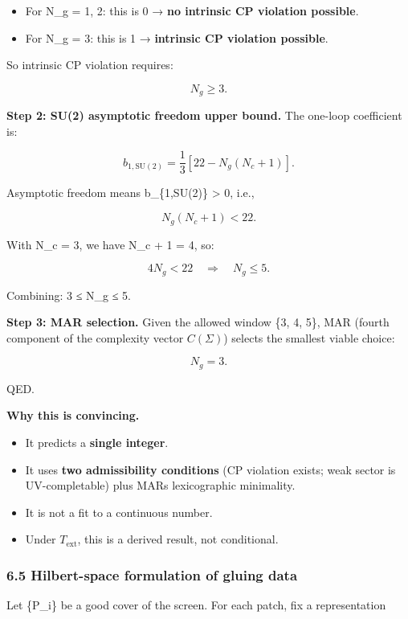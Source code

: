 \begin{itemize}
\tightlist
\item
  For N\_g = 1, 2: this is 0 → \textbf{no intrinsic CP violation possible}.
\item
  For N\_g = 3: this is 1 → \textbf{intrinsic CP violation possible}.
\end{itemize}

So intrinsic CP violation requires:

\[
N_g \ge 3.
\]

\textbf{Step 2: SU(2) asymptotic freedom upper bound.} The one-loop coefficient is:

\[
b_{1,\mathrm{SU}(2)} = \frac{1}{3}\left[22 - N_g(N_c + 1)\right].
\]

Asymptotic freedom means b\_\{1,SU(2)\} \textgreater{} 0, i.e.,

\[
N_g(N_c + 1) < 22.
\]

With N\_c = 3, we have N\_c + 1 = 4, so:

\[
4 N_g < 22 \quad \Rightarrow \quad N_g \le 5.
\]

Combining: 3 ≤ N\_g ≤ 5.

\textbf{Step 3: MAR selection.} Given the allowed window \{3, 4, 5\}, MAR (fourth component of the complexity vector \(C(\Sigma)\)) selects the smallest viable choice:

\[
N_g = 3.
\]

QED.

\textbf{Why this is convincing.}

\begin{itemize}
\tightlist
\item
  It predicts a \textbf{single integer}.
\item
  It uses \textbf{two admissibility conditions} (CP violation exists; weak sector is UV-completable) plus MAR\textquotesingle s lexicographic minimality.
\item
  It is not a fit to a continuous number.
\item
  Under \(T_{\mathrm{ext}}\), this is a derived result, not conditional.
\end{itemize}

\subsubsection{6.5 Hilbert-space formulation of gluing data}\label{65-hilbert-space-formulation-of-gluing-data}

Let \{P\_i\} be a good cover of the screen. For each patch, fix a representation

